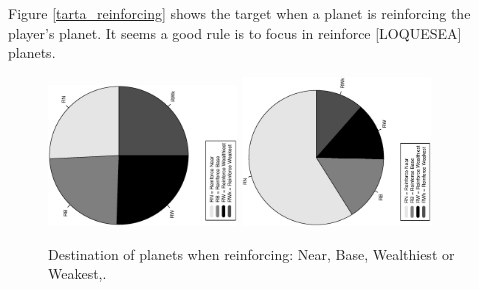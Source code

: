 \documentclass[conference]{IEEEtran}
\begin{document}
Figure \ref{tarta_reinforcing} shows the target when a planet is reinforcing the player's planet. It seems a good rule is to focus in reinforce [LOQUESEA] planets.
\begin{figure}[htb]
\tiny
\begin{center}

    \includegraphics[trim=1cm 7cm 1cm 7cm, clip=true,width=5cm,angle=-90]{./imags/distribution_initial_reinforce.eps}
    \includegraphics[trim=1cm 7cm 1cm 7cm, clip=true,width=5cm,angle=-90]{./imags/distribution_final_reinforce.eps}

\end{center}
\caption{Destination of planets when reinforcing: Near, Base, Wealthiest or Weakest,.}
\label{figura:tarta_reinforcing}
\end{figure}
\end{document}
